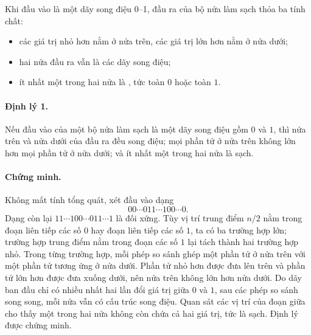 \documentclass[11pt]{article}
\begin{document}
Khi đầu vào là một dãy song điệu 0--1, đầu ra của bộ nửa làm sạch thỏa ba tính
chất:
\begin{itemize}
  \item các giá trị nhỏ hơn nằm ở nửa trên, các giá trị lớn hơn nằm ở nửa
  dưới;
  \item hai nửa đầu ra vẫn là các dãy song điệu;
  \item ít nhất một trong hai nửa là , tức toàn $0$ hoặc toàn $1$.
\end{itemize}

\paragraph{Định lý 1.}
Nếu đầu vào của một bộ nửa làm sạch là một dãy song điệu gồm $0$ và $1$, thì
nửa trên và nửa dưới của đầu ra đều song điệu; mọi phần tử ở nửa trên không
lớn hơn mọi phần tử ở nửa dưới; và ít nhất một trong hai nửa là sạch.

\paragraph{Chứng minh.}
Không mất tính tổng quát, xét đầu vào dạng
\[
  00\cdots 011\cdots 100\cdots 0.
\]
Dạng còn lại $11\cdots 100\cdots 011\cdots 1$ là đối xứng. Tùy vị trí trung
điểm $n/2$ nằm trong đoạn liên tiếp các số $0$ hay đoạn liên tiếp các số $1$,
ta có ba trường hợp lớn; trường hợp trung điểm nằm trong đoạn các số $1$ lại
tách thành hai trường hợp nhỏ. Trong từng trường hợp, mỗi phép so sánh ghép
một phần tử ở nửa trên với một phần tử tương ứng ở nửa dưới. Phần tử nhỏ hơn
được đưa lên trên và phần tử lớn hơn được đưa xuống dưới, nên nửa trên không
lớn hơn nửa dưới. Do dãy ban đầu chỉ có nhiều nhất hai lần đổi giá trị giữa
$0$ và $1$, sau các phép so sánh song song, mỗi nửa vẫn có cấu trúc song điệu.
Quan sát các vị trí của đoạn giữa cho thấy một trong hai nửa không còn chứa cả
hai giá trị, tức là sạch. Định lý được chứng minh.
\end{document}
